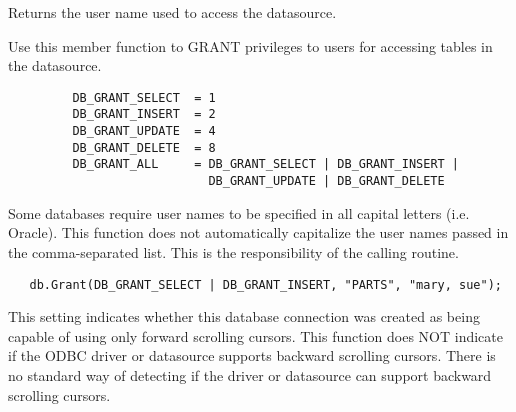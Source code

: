 
Returns the user name used to access the datasource.


\label{wxdbgrant}


Use this member function to GRANT privileges to users for accessing tables in the datasource.



\begin{verbatim}
         DB_GRANT_SELECT  = 1
         DB_GRANT_INSERT  = 2
         DB_GRANT_UPDATE  = 4
         DB_GRANT_DELETE  = 8
         DB_GRANT_ALL     = DB_GRANT_SELECT | DB_GRANT_INSERT |
                            DB_GRANT_UPDATE | DB_GRANT_DELETE
\end{verbatim}



Some databases require user names to be specified in all capital letters (i.e. Oracle).  This function does not automatically capitalize the user names passed in the comma-separated list.  This is the responsibility of the calling routine.


\begin{verbatim}
   db.Grant(DB_GRANT_SELECT | DB_GRANT_INSERT, "PARTS", "mary, sue");
\end{verbatim}


\label{wxdbisfwdonlycursors}


This setting indicates whether this database connection was created
as being capable of using only forward scrolling cursors.  This function
does NOT indicate if the ODBC driver or datasource supports backward
scrolling cursors.  There is no standard way of detecting if the driver
or datasource can support backward scrolling cursors.

